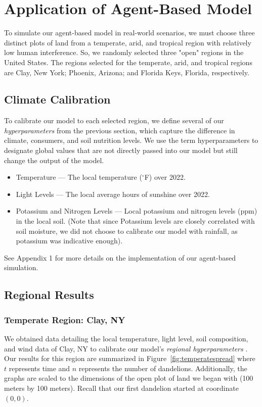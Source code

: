 \section{Application of Agent-Based Model}

To simulate our agent-based model in real-world scenarios, we must choose three distinct plots of land from a temperate, arid, and tropical region with relatively low human interference. So, we randomly selected three "open" regions in the United States. The regions selected for the temperate, arid, and tropical regions are Clay, New York; Phoenix, Arizona; and Florida Keys, Florida, respectively. 

\subsection{Climate Calibration}

To calibrate our model to each selected region, we define several of our \textit{hyperparameters} from the previous section, which capture the difference in climate, consumers, and soil nutrition levels. We use the term hyperparameters to designate global values that are not directly passed into our model but still change the output of the model. 

\begin{itemize}
    \item Temperature — The local temperature (\(^\circ\)F) over 2022.
    \item Light Levels — The local average hours of sunshine over 2022.
    \item Potassium and Nitrogen Levels — Local potassium and nitrogen levels (ppm) in the local soil. (Note that since Potassium levels are closely correlated with soil moisture, we did not choose to calibrate our model with rainfall, as potassium was indicative enough).    
\end{itemize}

See Appendix 1 for more details on the implementation of our agent-based simulation. 

\subsection{Regional Results}

\subsubsection{Temperate Region: Clay, NY}
We obtained data detailing the local temperature, light level, soil composition, and wind data of Clay, NY to calibrate our model's \textit{regional hyperparameters} \cite{aladin_wolcott_nodate, us_department_of_commerce_nowdata_nodate}. Our results for this region are summarized in Figure~\ref{fig:temperatespread} where \(t\) represents time and \(n\) represents the number of dandelions. Additionally, the graphs are scaled to the dimensions of the open plot of land we began with (100 meters by 100 meters). Recall that our first dandelion started at coordinate \((0,0)\).

